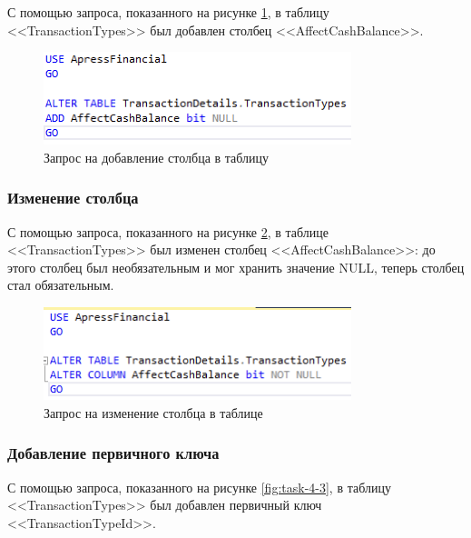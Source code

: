 \documentclass[a4paper, 14pt]{extarticle}
\begin{document}
С помощью запроса, показанного на рисунке \ref{fig:task-4-1}, в таблицу
<<TransactionTypes>> был добавлен столбец <<AffectCashBalance>>.

\begin{figure}[H]
  \centering
  \includegraphics[width=0.8\textwidth]{images/task-4/1.png}
  \caption{Запрос на добавление столбца в таблицу}
  \label{fig:task-4-1}
\end{figure}

\subsubsection{Изменение столбца}

С помощью запроса, показанного на рисунке \ref{fig:task-4-2}, в таблице
<<TransactionTypes>> был изменен столбец <<AffectCashBalance>>: до этого столбец
был необязательным и мог хранить значение NULL, теперь столбец стал
обязательным.

\begin{figure}[H]
  \centering
  \includegraphics[width=0.8\textwidth]{images/task-4/2.png}
  \caption{Запрос на изменение столбца в таблице}
  \label{fig:task-4-2}
\end{figure}

\subsubsection{Добавление первичного ключа}

С помощью запроса, показанного на рисунке \ref{fig:task-4-3}, в таблицу
<<TransactionTypes>> был добавлен первичный ключ <<TransactionTypeId>>.
\end{document}
